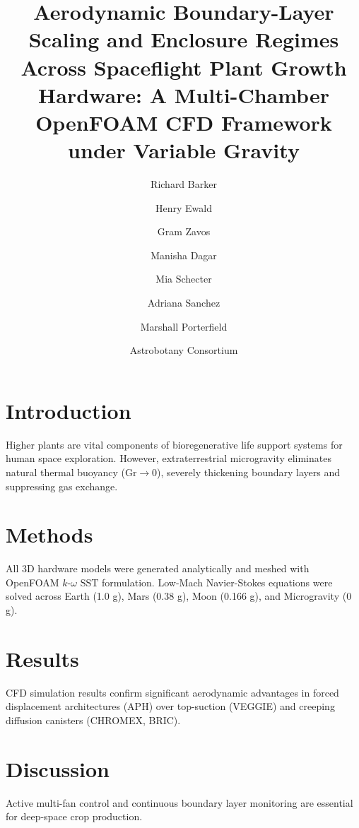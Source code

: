 \documentclass[fleqn,10pt,lineno]{wlpeerj}
\title{Aerodynamic Boundary-Layer Scaling and Enclosure Regimes Across Spaceflight Plant Growth Hardware: A Multi-Chamber OpenFOAM CFD Framework under Variable Gravity}
\author[1,*]{Richard Barker}
\author[1]{Henry Ewald}
\author[1]{Gram Zavos}
\author[1]{Manisha Dagar}
\author[1]{Mia Schecter}
\author[1]{Adriana Sanchez}
\author[1]{Marshall Porterfield}
\author[1]{Astrobotany Consortium}
\affil[1]{Department of Agricultural and Biological Engineering, Purdue University, West Lafayette, IN 47907, USA}
\begin{document}
\flushbottom
\maketitle
\thispagestyle{empty}

\section*{Introduction}
Higher plants are vital components of bioregenerative life support systems for human space exploration. However, extraterrestrial microgravity eliminates natural thermal buoyancy ($\text{Gr} \to 0$), severely thickening boundary layers and suppressing gas exchange.

\section*{Methods}
All 3D hardware models were generated analytically and meshed with OpenFOAM $k\text{-}\omega\text{ SST}$ formulation. Low-Mach Navier-Stokes equations were solved across Earth (1.0 g), Mars (0.38 g), Moon (0.166 g), and Microgravity (0 g).

\section*{Results}
CFD simulation results confirm significant aerodynamic advantages in forced displacement architectures (APH) over top-suction (VEGGIE) and creeping diffusion canisters (CHROMEX, BRIC).

\section*{Discussion}
Active multi-fan control and continuous boundary layer monitoring are essential for deep-space crop production.
\end{document}
